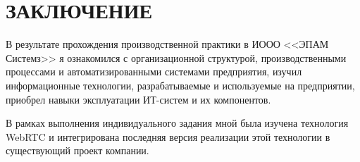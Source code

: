 \section*{ЗАКЛЮЧЕНИЕ}

В результате прохождения производственной практики в ИООО <<ЭПАМ Системз>> я ознакомился с
организационной структурой, производственными процессами и автоматизированными системами предприятия,
изучил информационные технологии, разрабатываемые и используемые на предприятии,
приобрел навыки эксплуатации ИТ-систем и их компонентов.

В рамках выполнения индивидуального задания мной была изучена технология WebRTC и
интегрирована последняя версия реализации этой технологии в существующий проект компании.